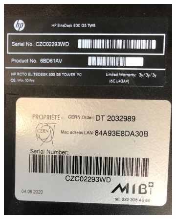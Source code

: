 \begin{figure}[H]
     \centering
     \begin{subfigure}[b]{0.45\textwidth}
         \centering
         \includegraphics[width=1\textwidth]{Graphics/remPCtop.jpg}
     \end{subfigure}
     \hfill
     \begin{subfigure}[b]{0.45\textwidth}
         \centering

\end{subfigure}
\end{figure}
